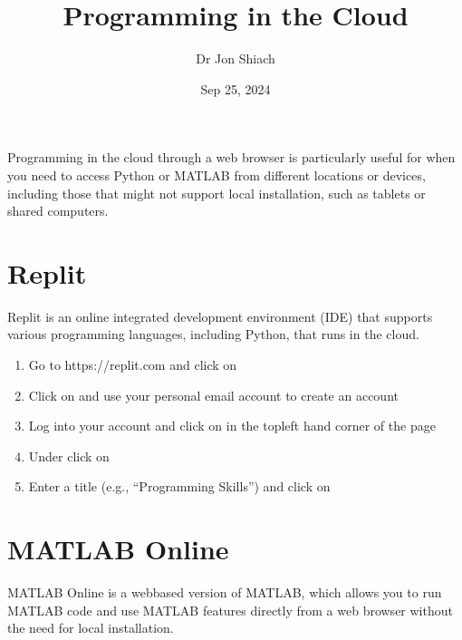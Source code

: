 \documentclass[letterpaper,10pt,english]{jupyterBook}
\title{Programming in the Cloud}
\date{Sep 25, 2024}
\author{Dr Jon Shiach}
\let\sphinxpxdimen\pdfpxdimen\else\newdimen\sphinxpxdimen
\begin{document}
\pagestyle{empty}
\sphinxmaketitle
\pagestyle{plain}
\sphinxtableofcontents
\pagestyle{normal}
\label{\detokenize{_pages/0.3_Programming_in_the_cloud::doc}}


\sphinxAtStartPar
Programming in the cloud through a web browser is particularly useful for when you need to access Python or MATLAB from different locations or devices, including those that might not support local installation, such as tablets or shared computers.


\part{Replit}
\label{\detokenize{_pages/0.3_Programming_in_the_cloud:replit}}
\sphinxAtStartPar
Replit is an online integrated development environment (IDE) that supports various programming languages, including Python, that runs in the cloud.
\begin{enumerate}
%
\item {} 
\sphinxAtStartPar
Go to https://replit.com and click on 

\item {} 
\sphinxAtStartPar
Click on  and use your personal email account to create an account

\item {} 
\sphinxAtStartPar
Log into your account and click on  in the top\sphinxhyphen{}left hand corner of the page

\item {} 
\sphinxAtStartPar
Under  click on 

\item {} 
\sphinxAtStartPar
Enter a title (e.g., “Programming Skills”) and click on 

\end{enumerate}

\begin{figure}[htbp]
\centering

\noindent\sphinxincludegraphics[width=600\sphinxpxdimen]{{0_Replit}.png}
\end{figure}


\part{MATLAB Online}
\label{\detokenize{_pages/0.3_Programming_in_the_cloud:matlab-online}}
\sphinxAtStartPar
MATLAB Online is a web\sphinxhyphen{}based version of MATLAB, which allows you to run MATLAB code and use MATLAB features directly from a web browser without the need for local installation.
\end{document}
